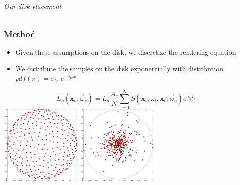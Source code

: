 \documentclass{beamer}
\newcommand{\vomega}{\vec{\omega}}
\newcommand{\x}{\mathbf{x}}
\begin{document}
\begin{frame}
\begin{columns}
\begin{column}{0.5\textwidth}
		\\\textit{Our disk placement}
    \end{column}
​  \end{columns}
\end{frame}

\begin{frame}
    \frametitle{Method}
			\begin{itemize}
			\item Given these assumptions on the disk, we discretize the rendering equation
			\item We distribute the samples on the disk exponentially with distribution $pdf(x) = \sigma_{tr} \;e^{-\sigma_{tr}x}$
			\end{itemize}
				$$
				L_o(\x_o,\vomega_o) = L_d \frac{A_c}{N} \sum_{i = 1}^N S(\x_i, \vomega_l, \x_o, \vomega_o)  e^{\sigma_{tr} r_i}
				$$
				\vspace{-0.6cm}
				\centering
				\includegraphics[width=0.3\textwidth]{halton.pdf} \hspace{1cm}	\includegraphics[width=0.3\textwidth]{halton_exp.pdf}
\end{frame}
\end{document}
